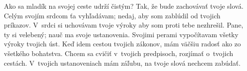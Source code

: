 Ako sa mladík na svojej ceste udrží čistým?
Tak, že bude zachovávať tvoje slová.
\versseparator
Celým svojím srdcom ťa vyhľadávam;
nedaj, aby som zablúdil od tvojich príkazov.
\versseparator
V~srdci si uchovávam tvoje výroky
aby som proti tebe nezhrešil.
\versseparator
Pane, ty si velebený;
nauč ma svoje ustanovenia.
\versseparator
Svojimi perami
vypočítavam všetky výroky tvojich úst.
\versseparator
Keď idem cestou tvojich zákonov, mám väčšiu radosť
ako zo všetkého bohatstva.
\versseparator
Chcem sa cvičiť v~tvojich predpisoch,
rozjímať o~tvojich cestách.
\versseparator
V~tvojich ustanoveniach mám záľubu,
na tvoje slová nechcem zabúdať.